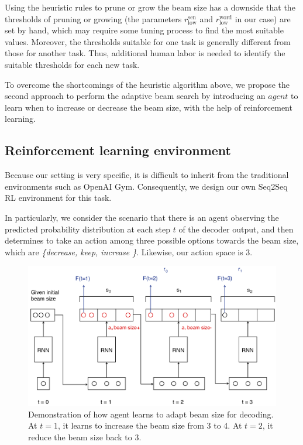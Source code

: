 \documentclass[11pt,a4paper]{article}
\begin{document}
Using the heuristic rules to prune or grow the beam size has a downside that the thresholds of pruning or growing (the parameters $r^{\textrm{sen}}_{\textrm{low}}$ and $r^{\textrm{word}}_{\textrm{low}}$ in our case) are set by hand, which may require some tuning process to find the most suitable values. Moreover, the thresholds suitable for one task is generally different from those for another task. Thus, additional human labor is needed to identify the suitable thresholds for each new task.

To overcome the shortcomings of the heuristic algorithm above, we propose the second approach to perform the adaptive beam search by introducing an $agent$ to learn when to increase or decrease the beam size, with the help of reinforcement learning.

\subsection{Reinforcement learning environment}
Because our setting is very specific, it is difficult to inherit from the traditional environments such as OpenAI Gym. Consequently, we design our own Seq2Seq RL environment for this task. 

In particularly, we consider the scenario that there is an agent observing the predicted probability distribution at each step $t$ of the decoder output, and then determines to take an action among three possible options towards the beam size, which are \textit{\{decrease, keep, increase \}}. Likewise, our action space is 3. 

%


\begin{figure}[ht]
\centering
\includegraphics[width=1.0\linewidth]{adapt.png}
\caption{Demonstration of how agent learns to adapt beam size for decoding. At $t=1$, it learns to increase the beam size from 3 to 4. At $t=2$, it reduce the beam size back to 3.}
\label{fig:adaptve}
\end{figure}
\end{document}
